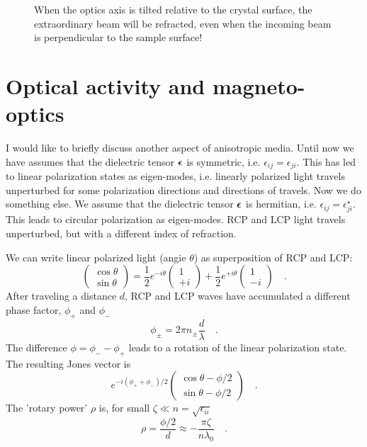 \begin{figure}
    \caption{When the optics axis is tilted relative to the crystal surface, the extraordinary beam will be refracted, even when the incoming beam is perpendicular to the sample surface! }
\end{figure}


\section{Optical activity and magneto-optics}

I would like to briefly discuss another aspect of anisotropic media. Until now we have assumes that the dielectric tensor $\boldsymbol{\epsilon}$ is symmetric, i.e. $\epsilon_{ij} = \epsilon_{ji}$. This has led to linear polarization states as eigen-modes, i.e. linearly polarized light travels unperturbed for some polarization directions and directions of travels. Now we do something else. We assume that the dielectric tensor $\boldsymbol{\epsilon}$ is hermitian, i.e. $\epsilon_{ij} = \epsilon_{ji}^\star$. This leads to circular polarization as eigen-modes. RCP and LCP light travels unperturbed, but with a different index of refraction.

We can write linear polarized light (angie $\theta$) as  superposition of RCP and LCP:
\begin{equation}
    \begin{pmatrix}
        \cos \theta \\ \sin \theta
    \end{pmatrix}
    = 
    \frac{1}{2} e^{-i \theta} 
    \begin{pmatrix}
        1 \\ +i 
    \end{pmatrix}
    +
    \frac{1}{2} e^{+i \theta} 
    \begin{pmatrix}
        1 \\ -i 
    \end{pmatrix} \quad .
\end{equation}
After traveling a distance $d$, RCP and LCP waves have accumulated a different phase factor, $\phi_+$ and $\phi_-$
\begin{equation}
    \phi_\pm = 2 \pi n_\pm \frac{d}{\lambda} \quad .
\end{equation}
The difference $\phi =\phi_- - \phi_+$ leads to a rotation of the linear polarization state. The resulting Jones vector is
\begin{equation}
    e^{-i (\phi_+ + \phi_-) / 2} 
    \begin{pmatrix}
        \cos \theta  - \phi/2\\ \sin \theta - \phi/2
    \end{pmatrix} \quad .
\end{equation}
The 'rotary power' $\rho$ is, for small $\zeta \ll n = \sqrt{\epsilon_{ii}}$
\begin{equation}
    \rho = \frac{\phi/2}{d} \approx - \frac{\pi \zeta}{n \lambda_0} \quad .
\end{equation}

